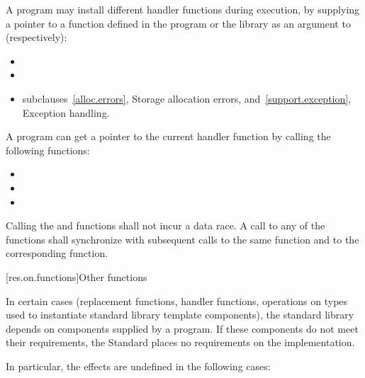 \pnum
A \Cpp program may install different handler functions during execution, by
supplying a pointer to a function defined in the program or the library
as an argument to (respectively):

\begin{itemize}
\item
{}%
\item
{}%
\item
{}

\xref
subclauses~\ref{alloc.errors}, Storage allocation errors, and~\ref{support.exception}, 
Exception handling.
\end{itemize}

\pnum
A \Cpp program can get a pointer to the current handler function by calling the following 
functions:

\begin{itemize}
\item
{}%
\item
{}%
\item
{}
\end{itemize}

\pnum
Calling the  and  functions shall not incur a data race. A call to
any of the  functions shall synchronize with subsequent calls to the same
 function and to the corresponding  function.

[res.on.functions]{Other functions}

\pnum
In certain cases (replacement functions, handler functions, operations on types used to
instantiate standard library template components), the \Cpp standard library depends on
components supplied by a \Cpp program.
If these components do not meet their requirements, the Standard places no requirements
on the implementation.

\pnum
In particular, the effects are undefined in the following cases:

